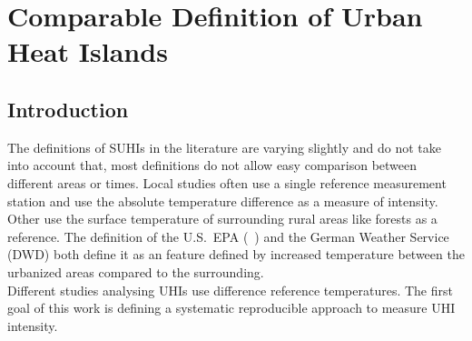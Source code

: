 \documentclass[12pt,a4paper, english,twoside]{scrartcl}
\begin{document}
    
\newpage
\section{Comparable Definition of Urban Heat Islands}\label{sec:definition}
    \subsection{Introduction}
      The definitions of \glspl{SUHI} in the literature are varying slightly and do not take into account that, most definitions do not allow easy comparison between different areas or times.
      Local studies often use a single reference measurement station and use the absolute temperature difference as a measure of intensity.
      Other use the surface temperature of surrounding rural areas like forests as a reference.
      The definition of the U.S.~EPA (~\cite{EPA2008}) and the German Weather Service (\gls{DWD}) both define it as an feature defined by increased temperature between the urbanized areas compared to the surrounding.\\ 
      Different studies analysing \glspl{UHI} use difference reference temperatures.
      The first goal of this work is defining a systematic reproducible approach to measure \gls{UHI} intensity.
\end{document}
